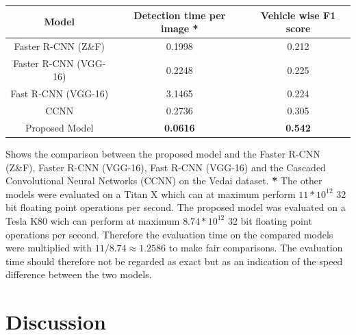 \documentclass{kththesis}
\begin{document}
\begin{center}
 \label{tab:vedai} 
\begin{tabular}{|c | c c|}
\hline
\textbf{Model} & \textbf{Detection time per image *}  & \textbf{Vehicle wise F1 score}\\
\hline
Faster R-CNN (Z\&F) & 0.1998 & 0.212\\
Faster R-CNN (VGG-16) & 0.2248 & 0.225\\
Fast R-CNN (VGG-16) & 3.1465 &  0.224\\
CCNN &0.2736 &  0.305\\
Proposed Model & \textbf{0.0616} & \textbf{0.542}\\
\hline
\end{tabular}
\caption{Shows the comparison between the proposed model and the Faster R-CNN (Z\&F), Faster R-CNN (VGG-16), Fast R-CNN (VGG-16) \parencite{zeiler_visualizing_2014} and the Cascaded Convolutional Neural Networks (CCNN) \parencite{zhong_robust_2017-1} on the Vedai dataset. \textbf{*} The other models were evaluated on a Titan X which can at maximum perform $11*10^{12}$ 32 bit floating point operations per second. The proposed model was evaluated on a Tesla K80 wich can perform at maximum $8.74*10^{12}$ 32 bit floating point operations per second. Therefore the evaluation time on the compared models were multiplied with $11/8.74\approx1.2586$ to make fair comparisons. The evaluation time should therefore not be regarded as exact but as an indication of the speed difference between the two models.}
\end{center}
\chapter{Discussion}
\printbibliography[heading=bibintoc] %

\appendix
%
\end{document}
